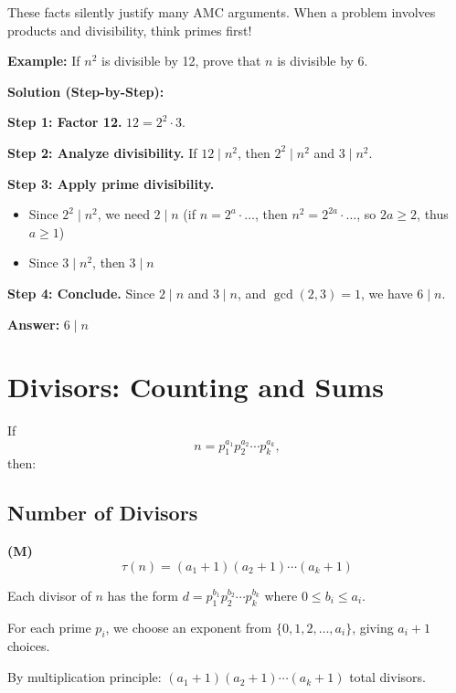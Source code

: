 \documentclass[12pt]{extarticle}
\begin{document}
\begin{remarkbox}
These facts silently justify many AMC arguments. When a problem involves products and divisibility, think primes first!
\end{remarkbox}

\begin{examplebox}
\textbf{Example:} If $n^2$ is divisible by 12, prove that $n$ is divisible by 6.

\textbf{Solution (Step-by-Step):}

\textbf{Step 1: Factor 12.} $12 = 2^2 \cdot 3$.

\textbf{Step 2: Analyze divisibility.} If $12 \mid n^2$, then $2^2 \mid n^2$ and $3 \mid n^2$.

\textbf{Step 3: Apply prime divisibility.} 
\begin{itemize}
    \item Since $2^2 \mid n^2$, we need $2 \mid n$ (if $n = 2^a \cdot \ldots$, then $n^2 = 2^{2a} \cdot \ldots$, so $2a \ge 2$, thus $a \ge 1$)
    \item Since $3 \mid n^2$, then $3 \mid n$
\end{itemize}

\textbf{Step 4: Conclude.} Since $2 \mid n$ and $3 \mid n$, and $\gcd(2,3)=1$, we have $6 \mid n$.

\textbf{Answer:} $\boxed{6 \mid n}$
\end{examplebox}

\section{Divisors: Counting and Sums}

If
\[
n = p_1^{a_1} p_2^{a_2} \cdots p_k^{a_k},
\]
then:

\subsection*{Number of Divisors}
\textbf{(M)}
\[
\tau(n) = (a_1+1)(a_2+1)\cdots(a_k+1)
\]

\begin{conceptbox}
Each divisor of $n$ has the form $d = p_1^{b_1} p_2^{b_2} \cdots p_k^{b_k}$ where $0 \le b_i \le a_i$.

For each prime $p_i$, we choose an exponent from $\{0, 1, 2, \ldots, a_i\}$, giving $a_i+1$ choices.

By multiplication principle: $(a_1+1)(a_2+1)\cdots(a_k+1)$ total divisors.
\end{conceptbox}
\end{document}
